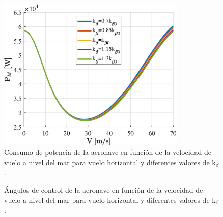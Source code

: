 \begin{figure}
	\centering
	\includegraphics[width=90mm]{graficos/PMVHkbeta}
	\caption{Consumo de potencia de la aeronave en función de la velocidad de vuelo a nivel del mar para vuelo horizontal y diferentes valores de k$_\beta$.}
	\label{PMVHkbeta}
\end{figure}
\begin{figure}
	\centering
	\caption{Ángulos de control de la aeronave en función de la velocidad de vuelo a nivel del mar para vuelo horizontal y diferentes valores de k$_\beta$.}
	\label{ControlVHkbeta}
\end{figure}
